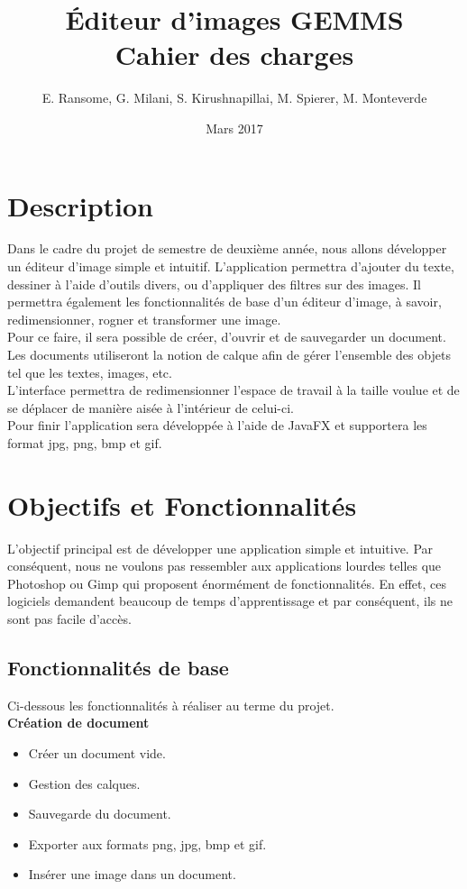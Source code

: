 \documentclass[11pt, a4paper, french]{article}
\title{Éditeur d'images GEMMS \\ Cahier des charges}
\author{E. Ransome, G. Milani, S. Kirushnapillai, M. Spierer, M. Monteverde}
\date{Mars 2017}
\begin{document}
	\maketitle
	\thispagestyle{empty}
	\tableofcontents
	\pagebreak

	\section{Description}
		Dans le cadre du projet de semestre de deuxième année, nous allons développer un éditeur d'image simple et intuitif. L'application permettra d'ajouter du texte, dessiner à l'aide d'outils divers, ou d'appliquer des filtres sur des images. Il permettra également les fonctionnalités de base d'un éditeur d'image, à savoir, redimensionner, rogner et transformer une image. \\

		Pour ce faire, il sera possible de créer, d'ouvrir et de sauvegarder un document. Les documents utiliseront la notion de calque afin de gérer l'ensemble des objets tel que les textes, images, etc. \\

		L’interface permettra de redimensionner l’espace de travail à la taille voulue et de se déplacer de manière aisée à l’intérieur de celui-ci. \\

		Pour finir l’application sera développée à l’aide de JavaFX et supportera les format jpg, png, bmp et gif.

	\section{Objectifs et Fonctionnalités}

		L'objectif principal est de développer une application simple et intuitive. Par conséquent, nous ne voulons pas ressembler aux applications lourdes telles que Photoshop ou Gimp qui proposent énormément de fonctionnalités. En effet, ces logiciels demandent beaucoup de temps d'apprentissage et par conséquent, ils ne sont pas facile d'accès.

		\subsection{Fonctionnalités de base}

			Ci-dessous les fonctionnalités à réaliser au terme du projet.\\

			\textbf{Création de document}
			\begin{itemize}[label=\textbullet]
				\item Créer un document vide.
				\item Gestion des calques.
				\item Sauvegarde du document.
				\item Exporter aux formats png, jpg, bmp et gif.
				\item Insérer une image dans un document. \\
			\end{itemize}
\end{document}
